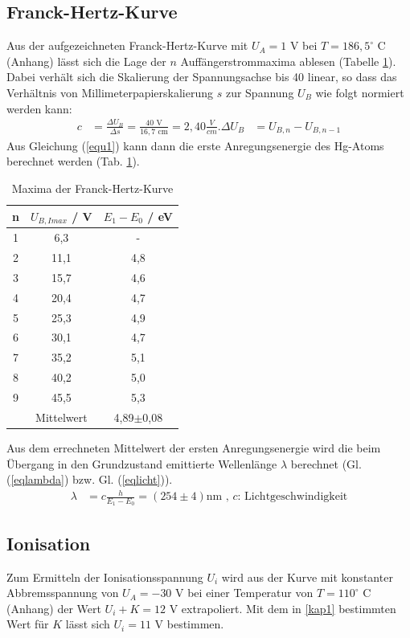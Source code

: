 \FloatBarrier

\subsection{Franck-Hertz-Kurve}

Aus der aufgezeichneten Franck-Hertz-Kurve mit $U_A=1$ V bei $T=186,5^{\circ}$ C (Anhang) lässt sich die Lage der $n$ Auffängerstrommaxima
ablesen (Tabelle \ref{tabmax}). Dabei verhält sich die Skalierung der Spannungsachse bis 40 linear, so dass das Verhältnis
von Millimeterpapierskalierung $s$ zur Spannung $U_B$ wie folgt normiert werden kann: 
\begin{align}
c&=\frac{\Delta U_B}{\Delta s}=\frac{40\text{ V}}{16,7\text{ cm}}=2,40\frac{V}{cm}.
\Delta U_B&=U_{B,n}-U_{B,n-1}
\end{align}
Aus Gleichung (\ref{equ1}) kann dann die erste Anregungsenergie des Hg-Atoms berechnet werden (Tab. \ref{tabmax}).

\begin{table}[h]
\begin{center}
\begin{tabular}[c]{ccc} 
n&$U_{B,I max}$ / V&$E_1-E_0$ / eV\\ \hline
1&6,3& - \\
2&11,1&4,8	\\
3&15,7&4,6	\\
4&20,4&4,7	\\
5&25,3&4,9	\\
6&30,1&4,7	\\
7&35,2&5,1	\\
8&40,2&5,0	\\
9&45,5&5,3\\ \hline
&Mittelwert&4,89$\pm$0,08
\end{tabular}
\caption{Maxima der Franck-Hertz-Kurve}
\label{tabmax}
\end{center}
\end{table}

Aus dem errechneten Mittelwert der ersten Anregungsenergie wird die beim Übergang in den Grundzustand
emittierte Wellenlänge $\lambda$ berechnet (Gl. (\ref{eqlambda}) bzw. Gl. (\ref{eqlicht})).
\begin{align}
\lambda&=c\frac{h}{E_1-E_0}= (254\pm4)\text{nm , $c$: Lichtgeschwindigkeit}\label{eqlambda}
\end{align}


\subsection{Ionisation}
Zum Ermitteln der Ionisationsspannung $U_i$ wird aus der Kurve mit konstanter Abbremsspannung von 
$U_A=-30$ V bei einer Temperatur von $T=110^{\circ}$ C (Anhang) der Wert $U_i+K=12$ V extrapoliert.
Mit dem in \ref{kap1} bestimmten Wert für $K$ lässt sich $U_i=11$ V bestimmen.
